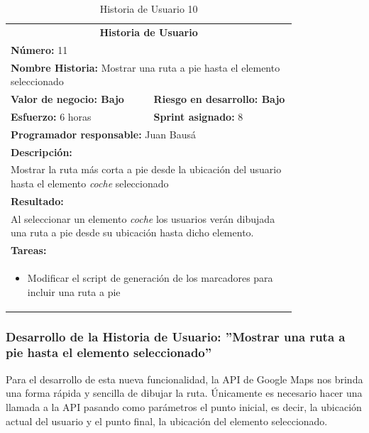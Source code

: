 		\begin{table}[H]
	  \centering 
	 	\begin{tabular}{p{0.4\linewidth}p{0.4\linewidth}}
	    \toprule
	    \multicolumn{2}{c}{\cellcolor{black!30}\textbf{Historia de Usuario}} 													\\
		\multicolumn{2}{l}{\cellcolor{gray!25}\textbf{Número: }11}																\\
		\multicolumn{2}{l}{\textbf{Nombre Historia: } Mostrar una ruta a pie hasta el elemento seleccionado}						\\
		\cellcolor{gray!25}\textbf{Valor de negocio: Bajo}	&	\cellcolor{gray!25}\textbf{Riesgo en desarrollo: Bajo}	\\
		\textbf{Esfuerzo:} 6 horas				&	\textbf{Sprint asignado: }8 												\\
		\multicolumn{2}{l}{\cellcolor{gray!25}\textbf{Programador responsable: }Juan Bausá}									\\
		\multicolumn{2}{l}{\textbf{Descripción:}}                                                     						\\
		\multicolumn{2}{l}{\parbox{15cm}{Mostrar la ruta más corta a pie desde la ubicación del usuario hasta el elemento \textit{coche} seleccionado}}				\\
		\multicolumn{2}{l}{\cellcolor{gray!25}\textbf{Resultado:}}																\\		
		\multicolumn{2}{l}{\parbox{15cm}{Al seleccionar un elemento \textit{coche} los usuarios verán dibujada una ruta a pie desde su ubicación hasta dicho elemento.}}																								\\
		\multicolumn{2}{l}{\textbf{Tareas:}}																					\\
		\multicolumn{2}{l}{
			\begin{minipage}{12cm}
	    		\vskip 4pt
	    		\begin{itemize}
	    			\item Modificar el script de generación de los marcadores para incluir una ruta a pie
				\end{itemize}
			  	\vskip 4pt
		 	\end{minipage}
		} \\																				
	    \hline
	  \end{tabular}
	  \caption{Historia de Usuario 10}
	\end{table}
	
	\subsubsection{Desarrollo de la Historia de Usuario: ''Mostrar una ruta a pie hasta el elemento seleccionado''}
	Para el desarrollo de esta nueva funcionalidad, la API de Google Maps nos brinda una forma rápida y sencilla de dibujar la ruta. Únicamente es necesario hacer una llamada a la API pasando como parámetros el punto inicial, es decir, la ubicación actual del usuario y el punto final, la ubicación del elemento seleccionado.
			

